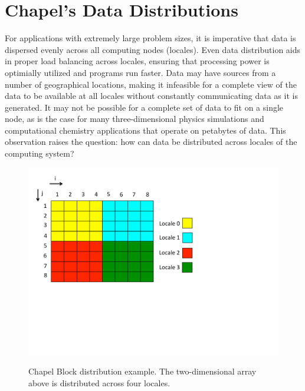 
\renewcommand{\thechapter}{2}

\chapter{Chapel's Data Distributions}\label{sec:data_distributions} 


For applications with extremely large problem sizes, it is imperative that data is dispersed evenly across all computing nodes (locales). Even data distribution aids in proper load balancing across locales, ensuring that processing power is optimially utilized and programs run faster. Data may have sources from a number of geographical locations, making it infeasible for a complete view of the data to be available at all locales without constantly communicating data as it is generated. It may not be possible for a complete set of data to fit on a single node, as is the case for many three-dimensional physics simulations and computational chemistry applications that operate on petabytes of data. This observation raises the question: how can data be distributed across locales of the computing system?

\begin{figure}
\begin{center}
\includegraphics[width=\linewidth]{./Figures/block_dist}
\renewcommand{\baselinestretch}{1}
\small\normalsize
\begin{quote}
\caption[Chapel Block distribution]{Chapel Block distribution example. The two-dimensional array above is distributed across four locales. \label{block_dist}}
\end{quote}
\end{center}
\end{figure}

